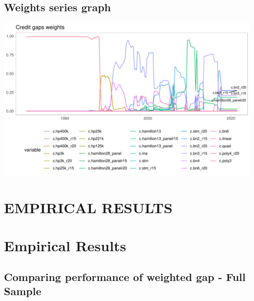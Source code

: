 \documentclass[
  12pt,
]{article}
\begin{document}
\hypertarget{weights-series-graph}{%
\subsection{Weights series graph}\label{weights-series-graph}}

\begin{center}\includegraphics[width=1\linewidth]{../Data/Output/Graphs/Weights_series} \end{center}

\hypertarget{empirical-results}{%
\section{EMPIRICAL RESULTS}\label{empirical-results}}

\hypertarget{empirical-results-1}{%
\section{Empirical Results}\label{empirical-results-1}}

\hypertarget{comparing-performance-of-weighted-gap---full-sample}{%
\subsection{Comparing performance of weighted gap - Full Sample}\label{comparing-performance-of-weighted-gap---full-sample}}
\end{document}
